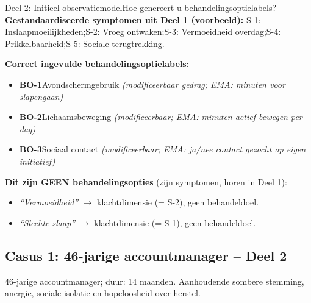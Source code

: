 \documentclass[11pt,a4paper]{article}
\begin{document}
\vspace{0.5em}
\nopagebreak[4]

\begin{voorbeeldbox}{Deel 2: Initieel observatiemodel}{Hoe genereert u behandelingsoptielabels?}
\small
\textbf{Gestandaardiseerde symptomen uit Deel 1 (voorbeeld):}
S-1: Inslaapmoeilijkheden;\enspace S-2: Vroeg ontwaken;\enspace S-3: Vermoeidheid overdag;\enspace S-4: Prikkelbaarheid;\enspace S-5: Sociale terugtrekking.

\medskip
\textbf{Correct ingevulde behandelingsoptielabels:}
\begin{itemize}[topsep=2pt,itemsep=1pt]
\item \textbf{BO-1}\enspace Avondschermgebruik
  \hfill\textit{(modificeerbaar gedrag; EMA: minuten voor slapengaan)}
\item \textbf{BO-2}\enspace Lichaamsbeweging
  \hfill\textit{(modificeerbaar; EMA: minuten actief bewegen per dag)}
\item \textbf{BO-3}\enspace Sociaal contact
  \hfill\textit{(modificeerbaar; EMA: ja/nee contact gezocht op eigen initiatief)}
\end{itemize}

\medskip
\textbf{\color{StrongRed}Dit zijn GEEN behandelingsopties} (zijn symptomen, horen in Deel 1):
\begin{itemize}[topsep=1pt,itemsep=0pt]
\item \textit{``Vermoeidheid''} $\rightarrow$ klachtdimensie (= S-2), geen behandeldoel.
\item \textit{``Slechte slaap''} $\rightarrow$ klachtdimensie (= S-1), geen behandeldoel.
\end{itemize}
\end{voorbeeldbox}

\vspace{0.5em}

\newpage
\subsection*{Casus 1: 46-jarige accountmanager -- Deel 2}

\begin{complaintbox}[title={Casus 1: verkorte klachtomschrijving}]
\small 46-jarige accountmanager; duur: 14 maanden. Aanhoudende sombere stemming, anergie, sociale isolatie en hopeloosheid over herstel.
\end{complaintbox}
\end{document}
